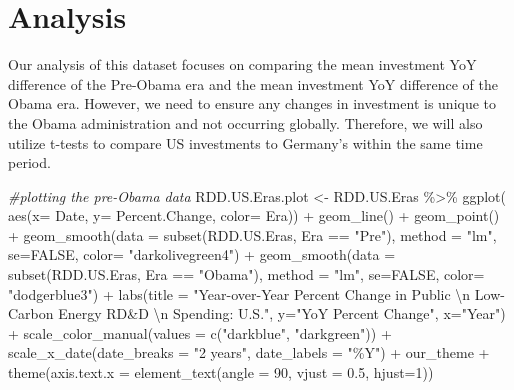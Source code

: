 \documentclass[
  12pt,
]{article}
\newenvironment{Shaded}{\begin{snugshade}}{\end{snugshade}}
\newcommand{\AttributeTok}[1]{\textcolor[rgb]{0.77,0.63,0.00}{#1}}
\newcommand{\CommentTok}[1]{\textcolor[rgb]{0.56,0.35,0.01}{\textit{#1}}}
\newcommand{\ConstantTok}[1]{\textcolor[rgb]{0.00,0.00,0.00}{#1}}
\newcommand{\DecValTok}[1]{\textcolor[rgb]{0.00,0.00,0.81}{#1}}
\newcommand{\FloatTok}[1]{\textcolor[rgb]{0.00,0.00,0.81}{#1}}
\newcommand{\FunctionTok}[1]{\textcolor[rgb]{0.00,0.00,0.00}{#1}}
\newcommand{\NormalTok}[1]{#1}
\newcommand{\OtherTok}[1]{\textcolor[rgb]{0.56,0.35,0.01}{#1}}
\newcommand{\SpecialCharTok}[1]{\textcolor[rgb]{0.00,0.00,0.00}{#1}}
\newcommand{\StringTok}[1]{\textcolor[rgb]{0.31,0.60,0.02}{#1}}
\begin{document}
\newpage

\hypertarget{analysis}{%
\section{Analysis}\label{analysis}}

Our analysis of this dataset focuses on comparing the mean investment
YoY difference of the Pre-Obama era and the mean investment YoY
difference of the Obama era. However, we need to ensure any changes in
investment is unique to the Obama administration and not occurring
globally. Therefore, we will also utilize t-tests to compare US
investments to Germany's within the same time period.

\begin{Shaded}
\begin{Highlighting}[]
\CommentTok{\#plotting the pre{-}Obama data}
\NormalTok{RDD.US.Eras.plot }\OtherTok{\textless{}{-}}\NormalTok{ RDD.US.Eras }\SpecialCharTok{\%\textgreater{}\%}
  \FunctionTok{ggplot}\NormalTok{(}
         \FunctionTok{aes}\NormalTok{(}\AttributeTok{x=}\NormalTok{ Date,}
             \AttributeTok{y=}\NormalTok{ Percent.Change,}
             \AttributeTok{color=}\NormalTok{ Era)) }\SpecialCharTok{+} 
  \FunctionTok{geom\_line}\NormalTok{() }\SpecialCharTok{+}
  \FunctionTok{geom\_point}\NormalTok{() }\SpecialCharTok{+}
  \FunctionTok{geom\_smooth}\NormalTok{(}\AttributeTok{data =} \FunctionTok{subset}\NormalTok{(RDD.US.Eras, Era }\SpecialCharTok{==} \StringTok{"Pre"}\NormalTok{), }\AttributeTok{method =} \StringTok{"lm"}\NormalTok{, }\AttributeTok{se=}\ConstantTok{FALSE}\NormalTok{, }\AttributeTok{color=} \StringTok{"darkolivegreen4"}\NormalTok{) }\SpecialCharTok{+}
  \FunctionTok{geom\_smooth}\NormalTok{(}\AttributeTok{data =} \FunctionTok{subset}\NormalTok{(RDD.US.Eras, Era }\SpecialCharTok{==} \StringTok{"Obama"}\NormalTok{), }\AttributeTok{method =} \StringTok{"lm"}\NormalTok{, }\AttributeTok{se=}\ConstantTok{FALSE}\NormalTok{, }\AttributeTok{color=} \StringTok{"dodgerblue3"}\NormalTok{) }\SpecialCharTok{+}
  \FunctionTok{labs}\NormalTok{(}\AttributeTok{title =} \StringTok{"Year{-}over{-}Year Percent Change in Public }\SpecialCharTok{\textbackslash{}n}\StringTok{ Low{-}Carbon Energy RD\&D }\SpecialCharTok{\textbackslash{}n}\StringTok{ Spending: U.S."}\NormalTok{,}
       \AttributeTok{y=}\StringTok{"YoY Percent Change"}\NormalTok{,}
       \AttributeTok{x=}\StringTok{"Year"}\NormalTok{) }\SpecialCharTok{+} 
  \FunctionTok{scale\_color\_manual}\NormalTok{(}\AttributeTok{values =} \FunctionTok{c}\NormalTok{(}\StringTok{"darkblue"}\NormalTok{, }\StringTok{"darkgreen"}\NormalTok{)) }\SpecialCharTok{+}
  \FunctionTok{scale\_x\_date}\NormalTok{(}\AttributeTok{date\_breaks =} \StringTok{"2 years"}\NormalTok{, }\AttributeTok{date\_labels =} \StringTok{"\%Y"}\NormalTok{) }\SpecialCharTok{+}
\NormalTok{  our\_theme }\SpecialCharTok{+}
  \FunctionTok{theme}\NormalTok{(}\AttributeTok{axis.text.x =} \FunctionTok{element\_text}\NormalTok{(}\AttributeTok{angle =} \DecValTok{90}\NormalTok{, }\AttributeTok{vjust =} \FloatTok{0.5}\NormalTok{, }\AttributeTok{hjust=}\DecValTok{1}\NormalTok{))}
  

\end{Highlighting}
\end{Shaded}
\end{document}
